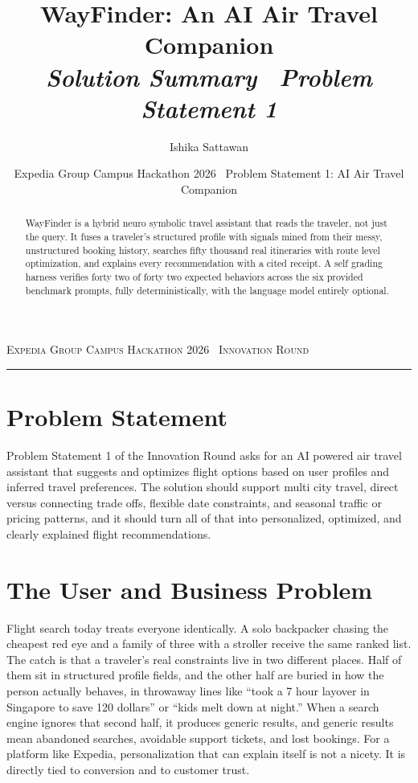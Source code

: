\documentclass[11pt,a4paper]{article}
\title{\vspace{-6mm}\textbf{WayFinder: An AI Air Travel Companion}\\[2pt]
  \large\itshape Solution Summary \textperiodcentered\ Problem Statement 1}
\author{Ishika Sattawan}
\date{Expedia Group Campus Hackathon 2026 \textperiodcentered\ Problem Statement 1: AI Air Travel Companion}
\begin{document}
\begin{center}
  {\footnotesize\scshape Expedia Group Campus Hackathon 2026 \textperiodcentered\ Innovation Round}
\end{center}
\vspace{2mm}
\maketitle
\vspace{-4mm}
\hrule
\vspace{4mm}

\begin{abstract}
\noindent WayFinder is a hybrid neuro symbolic travel assistant that reads the traveler, not
just the query. It fuses a traveler's structured profile with signals mined from their messy,
unstructured booking history, searches fifty thousand real itineraries with route level
optimization, and explains every recommendation with a cited receipt. A self grading harness
verifies forty two of forty two expected behaviors across the six provided benchmark prompts,
fully deterministically, with the language model entirely optional.
\end{abstract}

\section{Problem Statement}
Problem Statement 1 of the Innovation Round asks for an AI powered air travel assistant that
suggests and optimizes flight options based on user profiles and inferred travel preferences.
The solution should support multi city travel, direct versus connecting trade offs, flexible
date constraints, and seasonal traffic or pricing patterns, and it should turn all of that into
personalized, optimized, and clearly explained flight recommendations.

\section{The User and Business Problem}
Flight search today treats everyone identically. A solo backpacker chasing the cheapest red eye
and a family of three with a stroller receive the same ranked list. The catch is that a
traveler's real constraints live in two different places. Half of them sit in structured profile
fields, and the other half are buried in how the person actually behaves, in throwaway lines like
``took a 7 hour layover in Singapore to save 120 dollars'' or ``kids melt down at night.'' When a
search engine ignores that second half, it produces generic results, and generic results mean
abandoned searches, avoidable support tickets, and lost bookings. For a platform like Expedia,
personalization that can explain itself is not a nicety. It is directly tied to conversion and to
customer trust.
\end{document}

